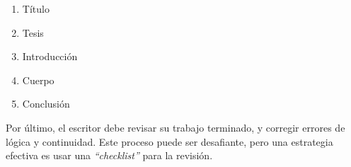 \documentclass[11pt]{article}
\theoremstyle{Tema} \newtheorem{Tema}{Tema} %
\theoremstyle{Tema} \newtheorem{Serie}{Serie}              %
\theoremstyle{Tema} \newtheorem{Ejercicio}{Ejercicio}    %
\begin{document}
\begin{enumerate}
	\item Título 
	\item Tesis
	\item Introducción
	\item Cuerpo
	\item Conclusión
\end{enumerate}

\medskip

Por último, el escritor debe revisar su trabajo terminado, y corregir errores de lógica y continuidad. Este proceso puede ser desafiante, pero una estrategia efectiva es usar una \textit{``checklist''} para la revisión.



\end{document}
